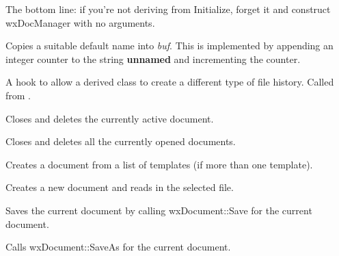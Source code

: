The bottom line: if you're not deriving from Initialize, forget it and
construct wxDocManager with no arguments.



Copies a suitable default name into {\it buf}. This is implemented by
appending an integer counter to the string {\bf unnamed} and incrementing
the counter.




A hook to allow a derived class to create a different type of file history. Called
from .



Closes and deletes the currently active document.



Closes and deletes all the currently opened documents.



Creates a document from a list of templates (if more than one template).



Creates a new document and reads in the selected file.



Saves the current document by calling wxDocument::Save for the current document.



Calls wxDocument::SaveAs for the current document.


